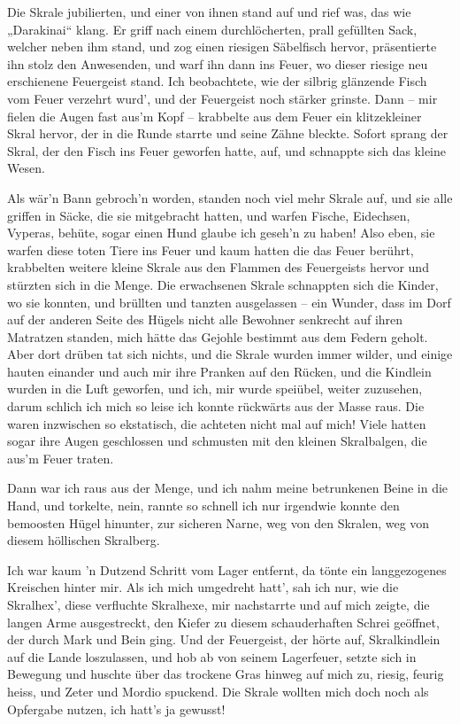 Die Skrale jubilierten, und einer von ihnen stand auf und rief was, das wie „Darakinai“ klang. Er griff nach einem durchlöcherten, prall gefüllten Sack, welcher neben ihm stand, und zog einen riesigen Säbelfisch hervor, präsentierte ihn stolz den Anwesenden, und warf ihn dann ins Feuer, wo dieser riesige neu erschienene Feuergeist stand. Ich beobachtete, wie der silbrig glänzende Fisch vom Feuer verzehrt wurd', und der Feuergeist noch stärker grinste. Dann – mir fielen die Augen fast aus’m Kopf – krabbelte aus dem Feuer ein klitzekleiner Skral hervor, der in die Runde starrte und seine Zähne bleckte. Sofort sprang der Skral, der den Fisch ins Feuer geworfen hatte, auf, und schnappte sich das kleine Wesen.

Als wär’n Bann gebroch’n worden, standen noch viel mehr Skrale auf, und sie alle griffen in Säcke, die sie mitgebracht hatten, und warfen Fische, Eidechsen, Vyperas, behüte, sogar einen Hund glaube ich geseh’n zu haben! Also eben, sie warfen diese toten Tiere ins Feuer und kaum hatten die das Feuer berührt, krabbelten weitere kleine Skrale aus den Flammen des Feuergeists hervor und stürzten sich in die Menge. Die erwachsenen Skrale schnappten sich die Kinder, wo sie konnten, und brüllten und tanzten ausgelassen – ein Wunder, dass im Dorf auf der anderen Seite des Hügels nicht alle Bewohner senkrecht auf ihren Matratzen standen, mich hätte das Gejohle bestimmt aus dem Federn geholt. Aber dort drüben tat sich nichts, und die Skrale wurden immer wilder, und einige hauten einander und auch mir ihre Pranken auf den Rücken, und die Kindlein wurden in die Luft geworfen, und ich, mir wurde speiübel, weiter zuzusehen, darum schlich ich mich so leise ich konnte rückwärts aus der Masse raus. Die waren inzwischen so ekstatisch, die achteten nicht mal auf mich! Viele hatten sogar ihre Augen geschlossen und schmusten mit den kleinen Skralbalgen, die aus’m Feuer traten.

Dann war ich raus aus der Menge, und ich nahm meine betrunkenen Beine in die Hand, und torkelte, nein, rannte so schnell ich nur irgendwie konnte den bemoosten Hügel hinunter, zur sicheren Narne, weg von den Skralen, weg von diesem höllischen Skralberg.

Ich war kaum ’n Dutzend Schritt vom Lager entfernt, da tönte ein langgezogenes Kreischen hinter mir. Als ich mich umgedreht hatt’, sah ich nur, wie die Skralhex’, diese verfluchte Skralhexe, mir nachstarrte und auf mich zeigte, die langen Arme ausgestreckt, den Kiefer zu diesem schauderhaften Schrei geöffnet, der durch Mark und Bein ging. Und der Feuergeist, der hörte auf, Skralkindlein auf die Lande loszulassen, und hob ab von seinem Lagerfeuer, setzte sich in Bewegung und huschte über das trockene Gras hinweg auf mich zu, riesig, feurig heiss, und Zeter und Mordio spuckend. Die Skrale wollten mich doch noch als Opfergabe nutzen, ich hatt’s ja gewusst!

